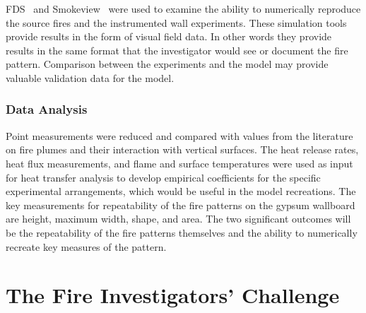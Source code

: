 \documentclass[twoside]{uocthesis}
\begin{document}
{FDS~\cite{FDS_Users_Guide} and Smokeview~\cite{Smokeview_Users_Guide} were used to examine the ability to numerically reproduce the source fires and the instrumented wall experiments. These simulation tools provide results in the form of visual field data.  In other words they provide results in the same format that the investigator would see or document the fire pattern.  Comparison between the experiments and the model may provide valuable validation data for the model.

\subsubsection{Data Analysis}

Point measurements were reduced and compared with values from the literature on fire plumes and their interaction with vertical surfaces.  The heat release rates, heat flux measurements, and flame and surface temperatures were used as input for heat transfer analysis to develop empirical coefficients for the specific experimental arrangements, which would be useful in the model recreations.
The key measurements for repeatability of the fire patterns on the gypsum wallboard are height, maximum width, shape, and area.  The two significant outcomes will be the repeatability of the fire patterns themselves and the ability to numerically recreate key measures of the pattern.

\section{The Fire Investigators' Challenge}

}
\end{document}
